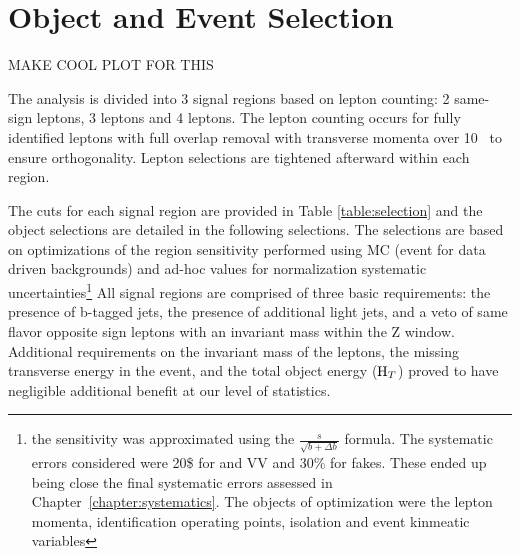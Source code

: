 \chapter[Object and Event Selection][Object and Event Selection]{Object and Event Selection}
\label{chapter:selection}

MAKE COOL PLOT FOR THIS

The analysis is divided into 3 signal regions based
on lepton counting: 2 same-sign leptons, 3 leptons and 4 leptons. The lepton
counting occurs for fully identified leptons with full overlap removal with
transverse momenta over 10 \gev\ to ensure orthogonality. Lepton selections are tightened
afterward within each region.

The cuts for each signal region are provided in Table \ref{table:selection} and the object selections are detailed in the
following selections. The selections are based on optimizations of the region sensitivity
performed using MC (event for data driven backgrounds) and ad-hoc values for normalization systematic uncertainties\footnote{the sensitivity was approximated using the $\frac{s}{\sqrt{b + \Delta b}}$ formula. The systematic errors considered were 20\$ for \ttV and VV and 30\% for fakes. These ended up being close the final systematic errors assessed in Chapter~\ref{chapter:systematics}. The objects of optimization were the lepton momenta, identification operating points, isolation and event kinmeatic variables} 
All signal regions are comprised of three basic requirements: the presence of b-tagged
jets, the presence of additional light jets, and a veto of same flavor opposite sign leptons with an
invariant mass within the Z window. Additional requirements on the invariant mass of the leptons, the missing transverse energy
in the event, and the total object energy ($\rm H_{T}$) proved to have negligible additional benefit at our level of 
statistics.

